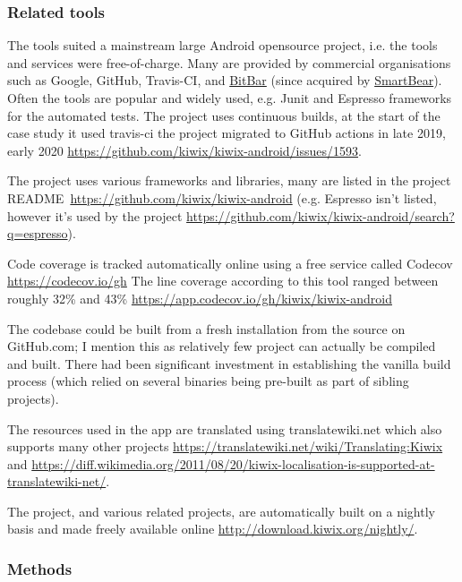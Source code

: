 \subsubsection{Related tools}
The tools suited a mainstream large Android opensource project, i.e. the tools and services were free-of-charge. Many are provided by commercial organisations such as Google, GitHub, Travis-CI, and \href{https://bitbar.com/}{BitBar} (since acquired by \href{https://smartbear.com/}{SmartBear}). Often the tools are popular and widely used, e.g. Junit and Espresso frameworks for the automated tests. The project uses continuous builds, at the start of the case study it used travis-ci the project migrated to GitHub actions in late 2019, early 2020 \url{https://github.com/kiwix/kiwix-android/issues/1593}.

The project uses various frameworks and libraries, many are listed in the project README~\url{https://github.com/kiwix/kiwix-android} (e.g. Espresso isn’t listed, however it’s used by the project \url{https://github.com/kiwix/kiwix-android/search?q=espresso}).

Code coverage is tracked automatically online using a free service called Codecov \url{https://codecov.io/gh} The line coverage according to this tool ranged between roughly 32\% and 43\% \url{https://app.codecov.io/gh/kiwix/kiwix-android}  

The codebase could be built from a fresh installation from the source on GitHub.com; I mention this as relatively few project can actually be compiled and built. There had been significant investment in establishing the vanilla build process (which relied on several binaries being pre-built as part of sibling projects).

The resources used in the app are translated using translatewiki.net which also supports many other projects \url{https://translatewiki.net/wiki/Translating:Kiwix} and \url{https://diff.wikimedia.org/2011/08/20/kiwix-localisation-is-supported-at-translatewiki-net/}.

The project, and various related projects, are automatically built on a nightly basis and made freely available online \url{http://download.kiwix.org/nightly/}.

\subsubsection{Methods}

